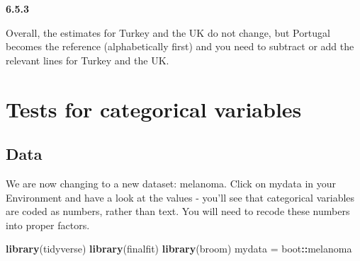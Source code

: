 \documentclass[]{book}
\makeatletter
\newenvironment{Shaded}{\begin{snugshade}}{\end{snugshade}}
\newcommand{\KeywordTok}[1]{\textcolor[rgb]{0.13,0.29,0.53}{\textbf{#1}}}
\newcommand{\DataTypeTok}[1]{\textcolor[rgb]{0.13,0.29,0.53}{#1}}
\newcommand{\DecValTok}[1]{\textcolor[rgb]{0.00,0.00,0.81}{#1}}
\newcommand{\StringTok}[1]{\textcolor[rgb]{0.31,0.60,0.02}{#1}}
\newcommand{\OperatorTok}[1]{\textcolor[rgb]{0.81,0.36,0.00}{\textbf{#1}}}
\newcommand{\NormalTok}[1]{#1}
\newenvironment{kframe}{%
\medskip{}
\setlength{\fboxsep}{.8em}
 \def\at@end@of@kframe{}%
 \ifinner\ifhmode%
  \def\at@end@of@kframe{\end{minipage}}%
  \begin{minipage}{\columnwidth}%
 \fi\fi%
 \def\FrameCommand##1{\hskip\@totalleftmargin \hskip-\fboxsep
 \colorbox{shadecolor}{##1}\hskip-\fboxsep
     \hskip-\linewidth \hskip-\@totalleftmargin \hskip\columnwidth}%
 \MakeFramed {\advance\hsize-\width
   \@totalleftmargin\z@ \linewidth\hsize
   \@setminipage}}%
 {\par\unskip\endMakeFramed%
 \at@end@of@kframe}
\renewenvironment{Shaded}{\begin{kframe}}{\end{kframe}}
\theoremstyle{definition}
\theoremstyle{definition}
\theoremstyle{definition}
\theoremstyle{remark}
\makeatother
\begin{document}
\textbf{6.5.3}

\begin{Shaded}
\end{Shaded}

Overall, the estimates for Turkey and the UK do not change, but Portugal
becomes the reference (alphabetically first) and you need to subtract or
add the relevant lines for Turkey and the UK.

\chapter{Tests for categorical
variables}\label{tests-for-categorical-variables}

\section{Data}\label{data-4}

We are now changing to a new dataset: melanoma. Click on mydata in your
Environment and have a look at the values - you'll see that categorical
variables are coded as numbers, rather than text. You will need to
recode these numbers into proper factors.

\begin{Shaded}
\begin{Highlighting}[]
\KeywordTok{library}\NormalTok{(tidyverse)}
\KeywordTok{library}\NormalTok{(finalfit)}
\KeywordTok{library}\NormalTok{(broom)}
\NormalTok{mydata =}\StringTok{ }\NormalTok{boot}\OperatorTok{::}\NormalTok{melanoma}
\end{Highlighting}
\end{Shaded}
\end{document}
